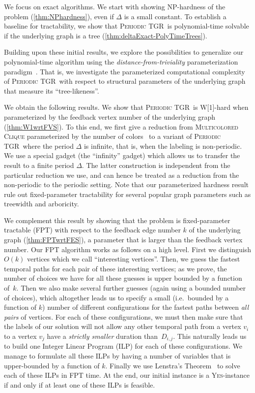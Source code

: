 \documentclass[a4paper,UKenglish,cleveref, autoref, thm-restate, anonymous]{lipics-v2021}
\newcommand{\deltaExact}{\textsc{Periodic TGR}}
\begin{document}
We focus on exact algorithms. We start with showing NP-hardness of the problem (\cref{thm:NPhardness}), even if $\Delta$ is a small constant. To establish a baseline for tractability, we show that \deltaExact\ is polynomial-time solvable if the underlying graph is a tree (\cref{thm:deltaExact-PolyTimeTrees}).

Building upon these initial results, we explore the possibilities to generalize our polynomial-time algorithm using the \emph{distance-from-triviality} parameterization paradigm~\cite{FJR13,GHN04}. That is, we investigate the parameterized computational complexity of \deltaExact\ with respect to structural parameters of the underlying graph that measure its ``tree-likeness''.

We obtain the following results. We show that \deltaExact\ is W[1]-hard when parameterized by the feedback vertex number of the underlying graph (\cref{thm:W1wrtFVS}). 
To this end, we first give a reduction from \textsc{Multicolored Clique} parameterized by the number of colors~\cite{fellows2009multipleinterval} to a variant of \deltaExact\ where the period $\Delta$ is infinite, that is, when the labeling is non-periodic. We use a special gadget (the ``infinity'' gadget) which allows us to transfer the result to a finite period $\Delta$. The latter construction is independent from the particular reduction we use, and can hence be treated as a reduction from the non-periodic to the periodic setting.
Note that our parameterized hardness result rule out fixed-parameter tractability for several popular graph parameters such as treewidth and arboricity.

We complement this result by showing that the problem is fixed-parameter tractable (FPT) with respect to the feedback edge number $k$ of the underlying graph (\cref{thm:FPTwrtFES}), a parameter that is larger than the feedback vertex number. 
Our FPT algorithm works as follows on a high level. 
First we distinguish $O(k)$ vertices which we call ``interesting vertices''. 
Then, we guess the fastest temporal paths for each pair of these interesting vertices; as we prove, the number of choices we have for all these guesses is upper bounded by a function of~$k$. 
Then we also make several further guesses (again using a bounded number of choices), which altogether leads us to specify a small (i.e.~bounded by a function of $k$) number of different configurations for the fastest paths between \emph{all pairs} of vertices. For each of these configurations, we must then make sure that the labels of our solution will not allow any other temporal path from a vertex $v_i$ to a vertex $v_j$ have a \emph{strictly smaller} duration than~$D_{i,j}$.
This naturally leads us to build one Integer Linear Program (ILP) for each of these configurations. We manage to formulate all these ILPs by having a number of variables that is upper-bounded by a function of $k$. Finally we use Lenstra's Theorem~\cite{Lenstra1983Integer} to solve each of these ILPs in FPT time. At the end, our initial instance is a \textsc{Yes}-instance if and only if at least one of these ILPs is feasible.
\end{document}
